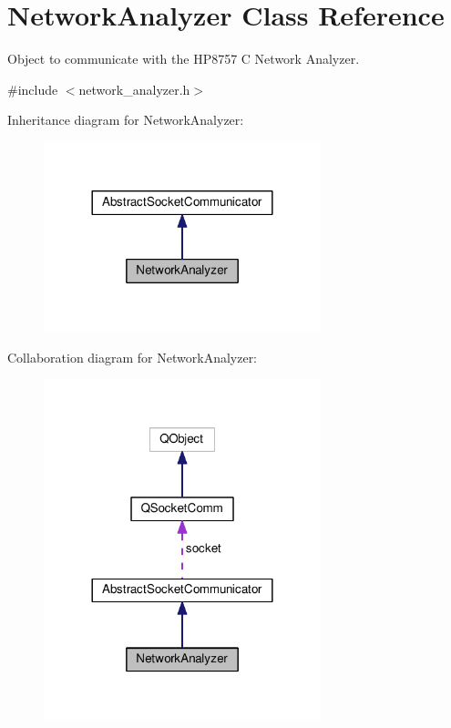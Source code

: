 \hypertarget{class_network_analyzer}{\section{Network\+Analyzer Class Reference}
\label{class_network_analyzer}
}


Object to communicate with the H\+P8757 C Network Analyzer.  




{\ttfamily \#include $<$network\+\_\+analyzer.\+h$>$}



Inheritance diagram for Network\+Analyzer\+:\nopagebreak
\begin{figure}[H]
\begin{center}
\leavevmode
\includegraphics[width=228pt]{class_network_analyzer__inherit__graph}
\end{center}
\end{figure}


Collaboration diagram for Network\+Analyzer\+:\nopagebreak
\begin{figure}[H]
\begin{center}
\leavevmode
\includegraphics[width=228pt]{class_network_analyzer__coll__graph}
\end{center}
\end{figure}
